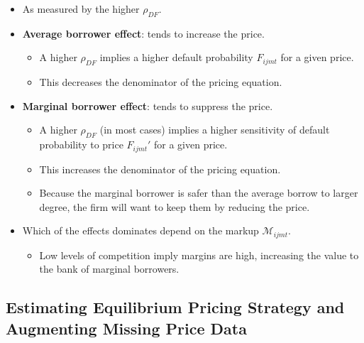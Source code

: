 \documentclass[]{book}
\providecommand{\tightlist}{%
  \setlength{\itemsep}{0pt}\setlength{\parskip}{0pt}}
\begin{document}
\begin{itemize}
\tightlist
\item
  As measured by the higher \(\rho_{DF}\).
\item
  \textbf{Average borrower effect}: tends to increase the price.

  \begin{itemize}
  \tightlist
  \item
    A higher \(\rho_{DF}\) implies a higher default probability
    \(F_{ijmt}\) for a given price.
  \item
    This decreases the denominator of the pricing equation.
  \end{itemize}
\item
  \textbf{Marginal borrower effect}: tends to suppress the price.

  \begin{itemize}
  \tightlist
  \item
    A higher \(\rho_{DF}\) (in most cases) implies a higher sensitivity
    of default probability to price \(F_{ijmt}'\) for a given price.
  \item
    This increases the denominator of the pricing equation.
  \item
    Because the marginal borrower is safer than the average borrow to
    larger degree, the firm will want to keep them by reducing the
    price.
  \end{itemize}
\item
  Which of the effects dominates depend on the markup
  \(\mathcal{M}_{ijmt}\).

  \begin{itemize}
  \tightlist
  \item
    Low levels of competition imply margins are high, increasing the
    value to the bank of marginal borrowers.
  \end{itemize}
\end{itemize}

\subsection{Estimating Equilibrium Pricing Strategy and Augmenting
Missing Price
Data}\label{estimating-equilibrium-pricing-strategy-and-augmenting-missing-price-data}
\end{document}

